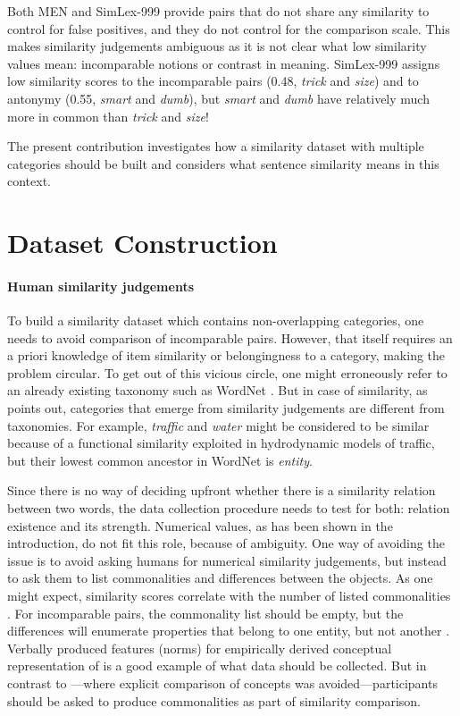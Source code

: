 \documentclass[11pt]{article}
\begin{document}
Both MEN and SimLex-999 provide pairs that do not share any similarity to control for false positives, and they do not control for the comparison scale. This makes similarity judgements ambiguous as it is not clear what low similarity values mean: incomparable notions or contrast in meaning. SimLex-999 assigns low similarity scores to the incomparable pairs (0.48, \textit{trick} and \textit{size}) and to antonymy (0.55, \textit{smart} and \textit{dumb}), but \textit{smart} and \textit{dumb} have relatively much more in common than \textit{trick} and \textit{size}!

The present contribution investigates how a similarity dataset with multiple categories should be built and considers what sentence similarity means in this context.

\section{Dataset Construction}

\paragraph{Human similarity judgements}

To build a similarity dataset which contains non-overlapping categories, one needs to avoid comparison of incomparable pairs. However, that itself requires an a priori knowledge of item similarity or belongingness to a category, making the problem circular. To get out of this vicious circle, one might erroneously  refer to an already existing taxonomy such as WordNet \cite{Miller:1995:WLD:219717.219748}. But in case of similarity, as  points out, categories that emerge from similarity judgements are different from taxonomies. For example, \textit{traffic} and \textit{water} might be considered to be similar because of a functional similarity exploited in hydrodynamic models of traffic, but their lowest common ancestor in WordNet is \textit{entity}.

Since there is no way of deciding upfront whether there is a similarity relation between two words, the data collection procedure needs to test for both: relation existence and its strength. Numerical values, as has been shown in the introduction, do not fit this role, because of ambiguity. One way of avoiding the issue is to avoid asking humans for numerical similarity judgements, but instead to ask them to list commonalities and differences between the objects. As one might expect, similarity scores correlate with the number of listed commonalities \cite{markman1991commonalities,Markman1996,medin1993respects}. For incomparable pairs, the commonality list should be empty, but the differences will enumerate properties that belong to one entity, but not another \cite{markman1991commonalities,medin1993respects}. Verbally produced features (norms) for empirically derived conceptual representation of  is a good example of what data should be collected. But in contrast to ---where explicit comparison of concepts was avoided---participants should be asked to produce commonalities as part of similarity comparison.
\end{document}

